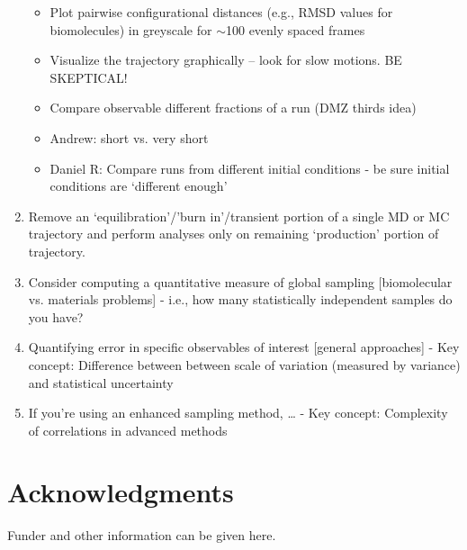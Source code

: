 \documentclass[9pt]{livecoms}
\begin{document}
\begin{enumerate}
\begin{itemize}
    \item Plot pairwise configurational distances (e.g., RMSD values for biomolecules) in greyscale for $\sim$100 evenly spaced frames
    \item Visualize the trajectory graphically -- look for slow motions.  BE SKEPTICAL!
    \item Compare observable different fractions of a run (DMZ thirds idea)
    \item Andrew: short vs. very short
    \item Daniel R: Compare runs from different initial conditions - be sure initial conditions are ‘different enough’
    \end{itemize}
\item
 Remove an ‘equilibration’/’burn in’/transient portion of a single MD or MC trajectory and perform analyses only on remaining ‘production’ portion of trajectory.
\item
 Consider computing a quantitative measure of global sampling [biomolecular vs. materials problems] - i.e., how many statistically independent samples do you have?
\item
 Quantifying error in specific observables of interest [general approaches]
    - Key concept: Difference between between scale of variation (measured by variance) and statistical uncertainty
\item
 If you’re using an enhanced sampling method, …
    - Key concept: Complexity of correlations in advanced methods
\end{enumerate}









\section{Acknowledgments}

Funder and other information can be given here.


%
\end{document}
